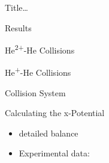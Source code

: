 \documentclass[letterpaper, 10 pt]{report}
\begin{document}
\begin{chapter}{ Title\dots \label{chap:p-he2p-he}}
\begin{section}{Results \label{sec:phe2p-res}}
\begin{subsection}{\texorpdfstring{He\textsuperscript{2+}}{He2+}-He Collisions 
                         \label{sec:he2phe-res}}
      \end{subsection}

   \end{section}

\end{chapter}

\begin{chapter}{\texorpdfstring{He\textsuperscript{+}}{He+}-He Collisions \label{chap:hephe}}

   \begin{section}{Collision System \label{sec:hephe-sys}}

   \end{section}

   \begin{section}{Calculating the x-Potential \label{sec:pot}}

   \end{section}

   \begin{section}{ \label{sec:hephe-det}}

   \end{section}

   \begin{section}{ \label{sec:hephe-res}}

   \end{section}

   \begin{itemize}
      
      \item detailed balance~\cite[p. 143--152]{scattering}

      \item Experimental data:~\cite{DT-88, Dub-89, FTFHLP-95, SSMSM-11}

   \end{itemize}

\end{chapter}
\end{document}
